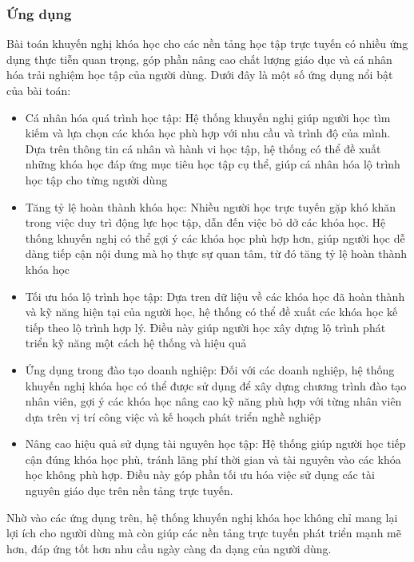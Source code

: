 \subsubsection{Ứng dụng}
Bài toán khuyến nghị khóa học cho các nền tảng học tập trực tuyến có nhiều ứng dụng thực tiễn quan trọng, góp phần nâng cao chất lượng giáo dục và cá nhân hóa trải nghiệm học tập của người dùng. Dưới đây là một số ứng dụng nổi bật của bài toán:
\begin{itemize}
    \item Cá nhân hóa quá trình học tập: Hệ thống khuyến nghị giúp người học tìm kiếm và lựa chọn các khóa học phù hợp với nhu cầu và trình độ của mình. Dựa trên thông tin cá nhân và hành vi học tập, hệ thống có thể đề xuất những khóa học đáp ứng mục tiêu học tập cụ thể, giúp cá nhân hóa lộ trình học tập cho từng người dùng
    \item Tăng tỷ lệ hoàn thành khóa học: Nhiều người học trực tuyến gặp khó khăn trong việc duy trì động lực học tập, dẫn đến việc bỏ dở các khóa học. Hệ thống khuyến nghị có thể gợi ý các khóa học phù hợp hơn, giúp người học dễ dàng tiếp cận nội dung mà họ thực sự quan tâm, từ đó tăng tỷ lệ hoàn thành khóa học
    \item Tối ưu hóa lộ trình học tập: Dựa tren dữ liệu về các khóa học đã hoàn thành và kỹ năng hiện tại của người học, hệ thống có thể đề xuất các khóa học kế tiếp theo lộ trình hợp lý. Điều này giúp người học xây dựng lộ trình phát triển kỹ năng một cách hệ thống và hiệu quả
    \item Ứng dụng trong đào tạo doanh nghiệp: Đối với các doanh nghiệp, hệ thống khuyến nghị khóa học có thể được sử dụng để xây dựng chương trình đào tạo nhân viên, gợi ý các khóa học nâng cao kỹ năng phù hợp với từng nhân viên dựa trên vị trí công việc và kế hoạch phát triển nghề nghiệp
    \item Nâng cao hiệu quả sử dụng tài nguyên học tập: Hệ thống giúp người học tiếp cận đúng khóa học phù, tránh lãng phí thời gian và tài nguyên vào các khóa học không phù hợp. Điều này góp phần tối ưu hóa việc sử dụng các tài nguyên giáo dục trên nền tảng trực tuyến.
\end{itemize}
Nhờ vào các ứng dụng trên, hệ thống khuyến nghị khóa học không chỉ mang lại lợi ích cho người dùng mà còn giúp các nền tảng trực tuyến phát triển mạnh mẽ hơn, đáp ứng tốt hơn nhu cầu ngày càng đa dạng của người dùng.
